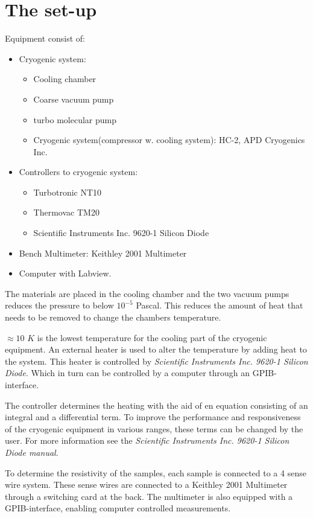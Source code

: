 \documentclass[a4paper,12pt]{article}
\begin{document}
\section{The set-up}
Equipment consist of:
\begin{itemize}
\item Cryogenic system:
\begin{itemize}
\item Cooling chamber
\item Coarse vacuum pump
\item turbo molecular pump
\item Cryogenic system(compressor w. cooling system): HC-2, APD Cryogenics Inc.
\end{itemize}
\item Controllers to cryogenic system: 
\begin{itemize}
\item Turbotronic NT10
\item Thermovac TM20
\item Scientific Instruments Inc. 9620-1 Silicon Diode
\end{itemize} 
\item Bench Multimeter: Keithley 2001 Multimeter
\item Computer with Labview.
\end{itemize}

The materials are placed in the cooling chamber and the two vacuum pumps reduces the pressure to below $10^{-5}$ Pascal. This reduces the amount of heat that needs to be removed to change the chambers temperature.

$\approx 10$ $K$ is the lowest temperature for the cooling part of the cryogenic equipment. An external heater is used to alter the temperature by adding heat to the system. This heater is controlled by \emph{Scientific Instruments Inc. 9620-1 Silicon Diode}. Which in turn can be controlled by a computer through an GPIB-interface. 

The controller determines the heating with the aid of en equation consisting of an integral and a differential term. To improve the performance and responsiveness of the cryogenic equipment in various ranges, these terms can be changed by the user. For more information see the \emph{Scientific Instruments Inc. 9620-1 Silicon Diode manual}.

To determine the resistivity of the samples, each sample is connected to a 4 sense wire system. These sense wires are connected to a Keithley 2001 Multimeter through a switching card at the back. The multimeter is also equipped with a GPIB-interface, enabling computer controlled measurements. 
\end{document}
